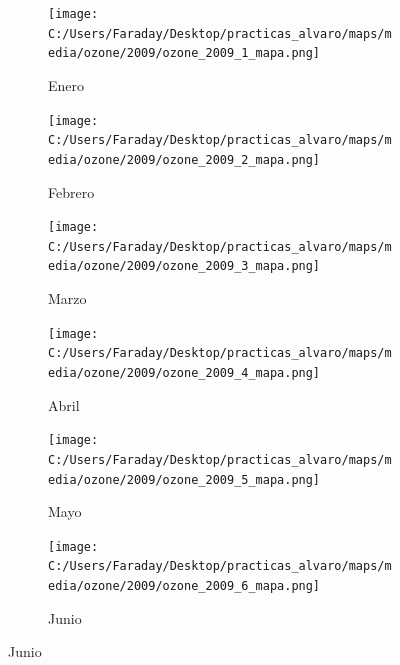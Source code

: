 \documentclass[12pt]{article}
\begin{document}
\begin{figure}[H]
\centering
\begin{subfigure}[H]{0.15\textwidth}
\texttt{[image: C:/Users/Faraday/Desktop/practicas\_alvaro/maps/media/ozone/2009/ozone\_2009\_1\_mapa.png]}
\captionsetup{labelformat=empty}
\caption{Enero}
\label{fig:map-ozone-2009-1}
\end{subfigure}
%
\begin{subfigure}[H]{0.15\textwidth}
\texttt{[image: C:/Users/Faraday/Desktop/practicas\_alvaro/maps/media/ozone/2009/ozone\_2009\_2\_mapa.png]}
\captionsetup{labelformat=empty}
\caption{Febrero}
\label{fig:map-ozone-2009-2}
\end{subfigure}
%
\begin{subfigure}[H]{0.15\textwidth}
\texttt{[image: C:/Users/Faraday/Desktop/practicas\_alvaro/maps/media/ozone/2009/ozone\_2009\_3\_mapa.png]}
\captionsetup{labelformat=empty}
\caption{Marzo}
\label{fig:map-ozone-2009-3}
\end{subfigure}
%
\begin{subfigure}[H]{0.15\textwidth}
\texttt{[image: C:/Users/Faraday/Desktop/practicas\_alvaro/maps/media/ozone/2009/ozone\_2009\_4\_mapa.png]}
\captionsetup{labelformat=empty}
\caption{Abril}
\label{fig:map-ozone-2009-4}
\end{subfigure}
%
\begin{subfigure}[H]{0.15\textwidth}
\texttt{[image: C:/Users/Faraday/Desktop/practicas\_alvaro/maps/media/ozone/2009/ozone\_2009\_5\_mapa.png]}
\captionsetup{labelformat=empty}
\caption{Mayo}
\label{fig:map-ozone-2009-5}
\end{subfigure}
%
\begin{subfigure}[H]{0.15\textwidth}
\texttt{[image: C:/Users/Faraday/Desktop/practicas\_alvaro/maps/media/ozone/2009/ozone\_2009\_6\_mapa.png]}
\captionsetup{labelformat=empty}
\caption{Junio}
\label{fig:map-ozone-2009-6}
\end{subfigure}


\end{figure}
\end{document}
